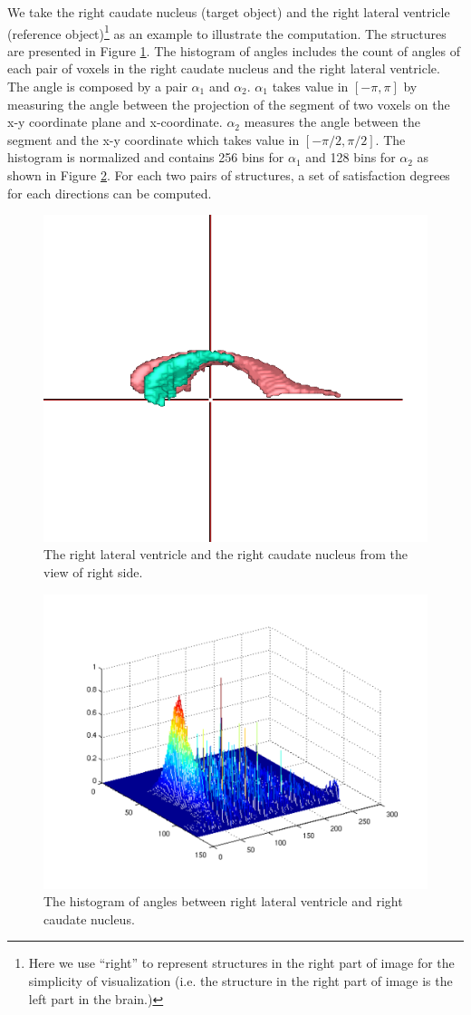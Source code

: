 \documentclass{article}
\begin{document}
We take the right caudate nucleus (target object) and the right lateral ventricle (reference object)\footnote{Here we use ``right'' to represent 
structures in the right part of image for the simplicity of visualization (i.e. the structure in the right part of image is the left part in the brain.)} as an example to illustrate the computation.
The structures are presented in Figure \ref{fig:sturctpair}.
The histogram of angles includes the count of angles of each pair of voxels in the right caudate nucleus and the right lateral ventricle.
The angle is composed by a pair $\alpha_1$ and $\alpha_2$. 
$\alpha_1$ takes value in $[-\pi, \pi]$ by measuring the angle between the projection of the segment of two voxels on the x-y coordinate plane and x-coordinate.
$\alpha_2$ measures the angle between the segment and the x-y coordinate which takes value in $[-\pi/2, \pi/2]$.
The histogram is normalized and contains 256 bins for $\alpha_1$ and 128 bins for $\alpha_2$ as shown in Figure \ref{fig:histopair}.
For each two pairs of structures, a set of satisfaction degrees for each directions can be computed.


\begin{figure}[h]
 \centering
 \includegraphics[width=.3\textwidth]{./figures/right_lvl_cdl.png}
 \caption{\label{fig:sturctpair}The right lateral ventricle and the right caudate nucleus from the view of right side.}
\end{figure}
\begin{figure}[h]
 \centering
 \includegraphics[width=.5\textwidth]{./figures/right_cdl_lvl_crop.pdf}
 \caption{\label{fig:histopair}The histogram of angles between right lateral ventricle and right caudate nucleus.}
\end{figure}
\end{document}
